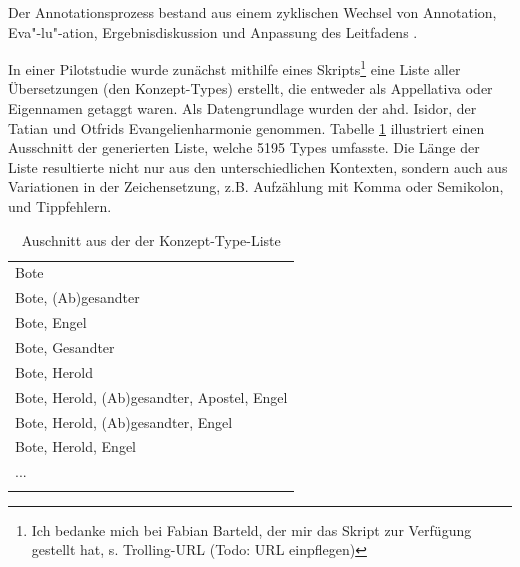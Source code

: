 Der Annotationsprozess bestand aus einem zyklischen Wechsel von Annotation, Eva"-lu"-ation, Ergebnisdiskussion und Anpassung des Leitfadens \parencite[entsprechend dem aus der Computerlinguistik bekannten  (= ), beschrieben u.a. in][109]{Pustejovsky2012}.

In einer Pilotstudie wurde zunächst mithilfe eines Skripts\footnote{Ich bedanke mich bei Fabian Barteld, der mir das Skript  zur Verfügung gestellt hat, s. Trolling-URL (Todo: URL einpflegen)}  eine Liste aller Übersetzungen (den Konzept-Types) erstellt, die entweder als Appellativa oder Eigennamen getaggt waren. Als Datengrundlage wurden der ahd. Isidor, der Tatian und Otfrids Evangelienharmonie genommen.  
Tabelle \ref{tab:konzept-types} illustriert einen Ausschnitt der generierten Liste, welche 5195 Types umfasste. Die Länge der Liste resultierte nicht nur aus den unterschiedlichen Kontexten, sondern auch aus Variationen in der Zeichensetzung, z.B. Aufzählung mit Komma oder Semikolon, und Tippfehlern.  

\begin{table}
\centering
\begin{tabular}{l}
\lsptoprule
\multicolumn{1}{c}{Übersetzung (Konzept-Type)}    \\ \midrule
Bote                                        \\
Bote, (Ab)gesandter                         \\
Bote, Engel                                 \\
Bote, Gesandter                             \\
Bote, Herold                                \\
Bote, Herold, (Ab)gesandter, Apostel, Engel \\
Bote, Herold, (Ab)gesandter, Engel          \\
Bote, Herold, Engel                         \\
...                                         \\ \lspbottomrule
\end{tabular}
\caption{Auschnitt aus der der Konzept-Type-Liste\label{tab:konzept-types}}
\end{table}

